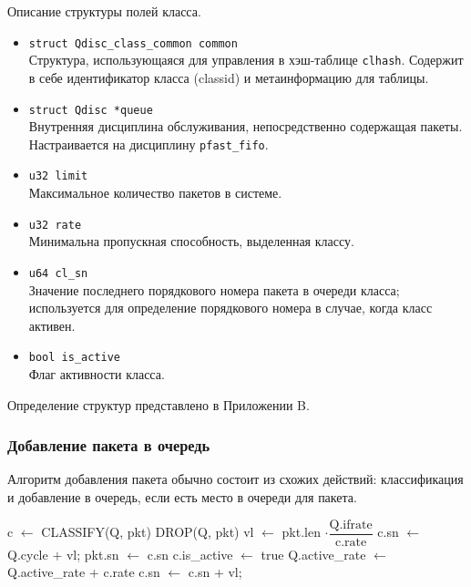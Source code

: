 			Описание структуры полей класса.
			\begin{itemize}
				\item \lstinline{struct Qdisc_class_common common} \\
					Структура, использующаяся для управления в хэш-таблице \lstinline{clhash}.
					Содержит в себе идентификатор класса (classid) и метаинформацию для таблицы.
				\item \lstinline{struct Qdisc *queue} \\
					Внутренняя дисциплина обслуживания, непосредственно содержащая пакеты.
					Настраивается на дисциплину \texttt{pfast\_fifo}.
				\item \lstinline{u32 limit}\\
					Максимальное количество пакетов в системе.
				\item \lstinline{u32 rate}\\
					Минимальна пропускная способность, выделенная классу.
				\item \lstinline{u64 cl_sn} \\
					Значение последнего порядкового номера пакета в очереди класса;
					используется для определение порядкового номера в случае, когда
					класс активен.
				\item \lstinline{bool is_active} \\
					Флаг активности класса.
			\end{itemize}

			Определение структур представлено в Приложении B. 

		\subsubsection{Добавление пакета в очередь}

			Алгоритм добавления пакета обычно состоит из схожих действий:
			классификация и добавление в очередь, если есть место в очереди
			для пакета. 

			\begin{algorithmic}
					\State c $\gets $ CLASSIFY(Q, pkt)
						\State DROP(Q, pkt)
						\State vl $\gets$ pkt.len $\cdot \dfrac {\text{Q.ifrate}} {\text{c.rate}} $
							\State c.sn $\gets$ Q.cycle $+$ vl; 
							\State pkt.sn $\gets$ c.sn
							\State c.is\_active $\gets$ true
							\State Q.active\_rate $\gets$ Q.active\_rate + c.rate
						\Else
							\State c.sn $\gets$ c.sn + vl;
						\EndIf
					\EndIf
				\EndFunction
			\end{algorithmic}

